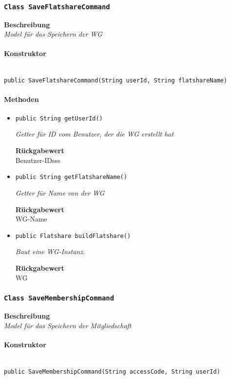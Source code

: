     \subsubsection{\texttt{Class SaveFlatshareCommand}}
    \textbf{Beschreibung} \\
    \textit{Model für das Speichern der WG}
    \paragraph*{Konstruktor}\mbox{} \\
    \texttt{public SaveFlatshareCommand(String userId, String flatshareName)} \\
    \paragraph*{Methoden}
    \begin{itemize}
    	\item{\texttt{public String getUserId()}}
    	
    	\textit{Getter für ID vom Benutzer, der die WG erstellt hat}
    	
    	
    	
    	\textbf{Rückgabewert} \\
    	Benutzer-IDsss        \item{\texttt{public String getFlatshareName()}}
    	
    	\textit{Getter für Name von der WG}
    	
    	
    	
    	\textbf{Rückgabewert} \\
    	WG-Name        \item{\texttt{public Flatshare buildFlatshare()}}
    	
    	\textit{Baut eine WG-Instanz.}
    	
    	
    	
    	\textbf{Rückgabewert} \\
    	WG
    \end{itemize}
    \subsubsection{\texttt{Class SaveMembershipCommand}}
    \textbf{Beschreibung} \\
    \textit{Model für das Speichern der Mitgliedschaft}
    \paragraph*{Konstruktor}\mbox{} \\
    \texttt{public SaveMembershipCommand(String accessCode, String userId)} \\
